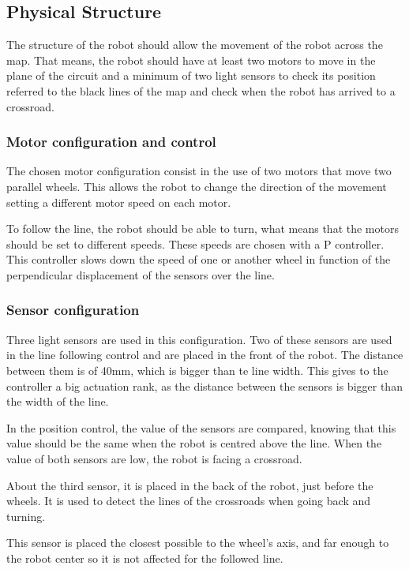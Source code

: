 \subsection{Physical Structure}
The structure of the robot should allow the movement of the robot across the map. 
That means, the robot should have at least two motors to move in the plane of the circuit and a minimum of two light sensors to check its position referred to the black lines of the map and check when the robot has arrived to a crossroad.

\subsubsection{Motor configuration and control}
The chosen motor configuration consist in the use of two motors that move two parallel wheels. 
This allows the robot to change the direction of the movement setting a different motor speed on each motor.

To follow the line, the robot should be able to turn, what means that the motors should be set to different speeds.
These speeds are chosen with a P controller.
This controller slows down the speed of one or another wheel in function of the perpendicular displacement of the sensors 
over the line. 


\subsubsection{Sensor configuration}

Three light sensors are used in this configuration. 
Two of these sensors are used in the line following control and are placed in the front of the robot.
The distance between them is of 40mm, which is bigger than te line width.
This gives to the controller a big actuation rank, as the distance between the sensors is bigger than the width of the line.

In the position control, the value of the sensors are compared, knowing that this value should be the same when the robot is centred above the line.
When the value of both sensors are low, the robot is facing a crossroad.

About the third sensor, it is placed in the back of the robot, just before the wheels.
It is used to detect the lines of the crossroads when going back and turning.

This sensor is placed the closest possible to the wheel's axis, and far enough to the robot center so it is not affected
for the followed line.

